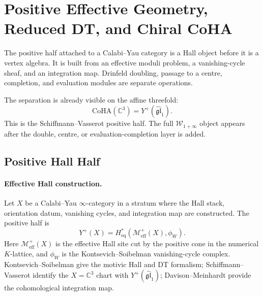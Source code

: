 \providecommand{\C}{\mathbb{C}}
\providecommand{\Z}{\mathbb{Z}}
\providecommand{\Q}{\mathbb{Q}}
\providecommand{\bP}{\mathbb{P}}
\providecommand{\bF}{\mathbb{F}}
\providecommand{\dP}{\mathrm{dP}}
\providecommand{\cO}{\mathcal{O}}
\providecommand{\Cstar}{\mathbb{C}^{\times}}
\providecommand{\Db}{D^{b}}
\providecommand{\Coh}{\mathrm{Coh}}
\providecommand{\CoHA}{\mathrm{CoHA}}
\providecommand{\DT}{\mathrm{DT}}
\providecommand{\Hilb}{\mathrm{Hilb}}
\providecommand{\Heq}{H^{*}_{\mathrm{eq}}}
\providecommand{\Meff}{\mathcal{M}^{+}_{\mathrm{eff}}}
\providecommand{\Yplus}{Y^{+}}
\providecommand{\Ypluscy}{Y^{+}(X)}
\providecommand{\Sp}{\mathrm{Sp}}
\providecommand{\PhiFA}{\Phi^{\mathrm{FA}}}
\providecommand{\Obs}{\mathrm{Obs}}
\providecommand{\hCS}{\mathrm{hCS}}
\providecommand{\Dfive}{D_5}
\providecommand{\PhiTenOP}{\Phi_{10}^{\mathrm{OP}}}
\providecommand{\Stab}{\mathrm{Stab}}
\providecommand{\Auts}{\mathrm{Aut}_{s}}
\providecommand{\kch}{\kappa_{\mathrm{ch}}}
\providecommand{\kcat}{\kappa_{\mathrm{cat}}}
\providecommand{\kBKM}{\kappa_{\mathrm{BKM}}}
\providecommand{\kfib}{\kappa_{\mathrm{fiber}}}
\providecommand{\gl}{\mathfrak{gl}}
\providecommand{\glhat}{\widehat{\mathfrak{gl}}}

\section*{Positive Effective Geometry, Reduced DT, and Chiral CoHA}
\label{sec:positive-effective-geometry}

The positive half attached to a Calabi--Yau category is a Hall object
before it is a vertex algebra. It is built from an effective moduli
problem, a vanishing-cycle sheaf, and an integration map. Drinfeld
doubling, passage to a centre, completion, and evaluation modules are
separate operations.

The separation is already visible on the affine threefold:
\[
  \CoHA(\C^3)=\Yplus(\glhat_1).
\]
This is the Schiffmann--Vasserot positive half. The full
\(\mathcal{W}_{1+\infty}\) object appears after the double, centre,
or evaluation-completion layer is added.

\subsection*{Positive Hall Half}

\paragraph{Effective Hall construction.}
Let \(X\) be a Calabi--Yau \(\infty\)-category in a stratum where the
Hall stack, orientation datum, vanishing cycles, and integration map are
constructed. The positive half is
\[
  \Ypluscy=\Heq(\Meff(X),\phi_W).
\]
Here \(\Meff(X)\) is the effective Hall site cut by the positive cone in
the numerical \(K\)-lattice, and \(\phi_W\) is the
Kontsevich--Soibelman vanishing-cycle complex. Kontsevich--Soibelman
give the motivic Hall and DT formalism; Schiffmann--Vasserot identify
the \(X=\C^3\) chart with \(\Yplus(\glhat_1)\); Davison--Meinhardt
provide the cohomological integration map.

